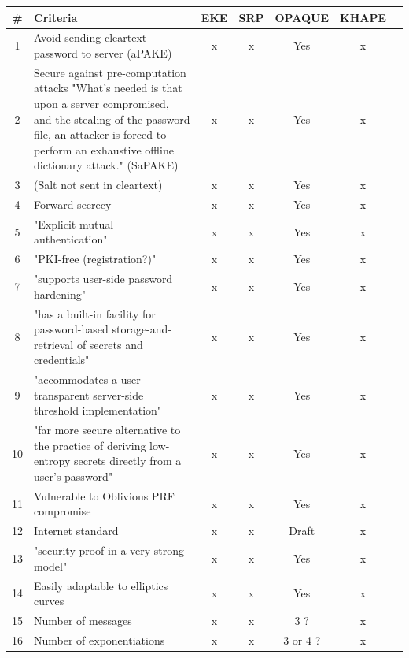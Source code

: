 \documentclass[../report.tex]{subfiles}
\begin{document}
\begin{center}
   \begin{tabular}{ | c | p{8cm} || c | c | c | c | c | }
     \hline
     \textbf{\#} & \textbf{Criteria} & \textbf{EKE} & \textbf{SRP} & \textbf{OPAQUE} & \textbf{KHAPE} \\ \hline
     
     
     
     1 & Avoid sending cleartext password to server (aPAKE) & x & x & Yes & x \\ \hline
     
     2 & Secure against pre-computation attacks {"What's needed is that upon a server compromised, and the stealing of the password file, an attacker is forced to perform an exhaustive offline dictionary attack."} (SaPAKE) & x & x & Yes & x \\ \hline
     
     3 & (Salt not sent in cleartext) & x & x & Yes & x \\ \hline
     4 & Forward secrecy & x & x & Yes & x \\ \hline
     5 & "Explicit mutual authentication" & x & x & Yes & x \\ \hline
     6 & "PKI-free (registration?)" & x & x & Yes & x \\ \hline
     7 & "supports user-side password hardening" & x & x & Yes & x \\ \hline
     8 & "has a built-in facility for password-based storage-and-retrieval of secrets and credentials" & x & x & Yes & x \\ \hline
     9 & "accommodates a user-transparent server-side threshold implementation" & x & x & Yes & x \\ \hline
     10 &"far more secure alternative to the practice of deriving low-entropy secrets directly from a user's password" & x & x & Yes & x \\ \hline
     
     11 & Vulnerable to Oblivious PRF compromise & x & x & Yes & x \\ \hline
     12 & Internet standard & x & x & Draft & x \\ \hline
     
     13 & "security proof in a very strong model" & x & x & Yes & x \\ \hline
     
     
     14 & Easily adaptable to elliptics curves & x & x & Yes & x \\ \hline
     15 & Number of messages & x & x & 3 ? & x \\ \hline
     16 & Number of exponentiations & x & x & 3 or 4 ? & x \\ \hline

     \end{tabular}
 \end{center}
 
\end{document}
